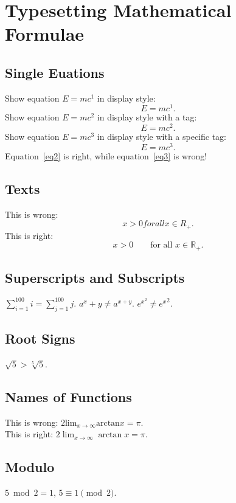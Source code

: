 \documentclass{article}
\begin{document}
    \section{Typesetting Mathematical Formulae}
    \subsection{Single Euations}
    Show equation $E=mc^1$ in display style:
    \begin{equation*}
        E=mc^1.
    \end{equation*}
    Show equation $E=mc^2$ in display style with a tag:
    \begin{equation}
        E=mc^2. \label{eq2}
    \end{equation}
    Show equation $E=mc^3$ in display style with a specific tag:
    \begin{equation}
        E=mc^3. \tag{$\ast$} \label{eq3}
    \end{equation}
    Equation~\eqref{eq2} is right, while equation~\eqref{eq3} is wrong!
    \subsection{Texts}
    This is wrong:
    \begin{equation*}
        x > 0    for all x \in R_+.
    \end{equation*}
    This is right:
    \begin{equation*}
        x > 0 \qquad \text{for all } x \in \mathbb{R_+}.
    \end{equation*}
    \subsection{Superscripts and Subscripts}
    $ \sum_{i=1}^{100} i = \sum^{100}_{j=1} j $.
    $ a^x+y \neq a^{x+y} $.
    $ e^{x^2} \neq {e^x}^2 $.
    \subsection{Root Signs}
    $ \sqrt{5} > \sqrt[5]{5} $.
    \subsection{Names of Functions}
    This is wrong:
    $ 2 \text{lim}_{x \rightarrow \infty} \text{arctan} x = \pi $.\\
    This is right:
    $ 2 \lim_{x \rightarrow \infty} \arctan x = \pi $.
    \subsection{Modulo}
    $ 5 \bmod 2 = 1$, $ 5 \equiv 1 \pmod{2}$.
\end{document}
